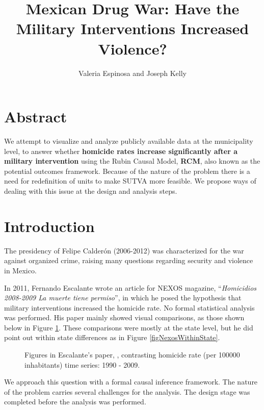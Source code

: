 \documentclass{article}[11 pt]
\begin{document}
	\title{Mexican Drug War: Have the Military Interventions Increased Violence?}
	\author{Valeria Espinosa and Joseph Kelly}
	
	\maketitle

\section{Abstract}
  We attempt to visualize and analyze publicly available data at the municipality level, to answer whether \textbf{homicide rates increase significantly after a military intervention} using the Rubin Causal Model, \textbf{RCM}, also known as the potential outcomes framework. Because of the nature of the problem there is a need for redefinition of units to make SUTVA more feasible. We propose ways of dealing with this issue at the design and analysis steps.
	
\section{Introduction}	
	The presidency of Felipe Calder\'{o}n (2006-2012) was characterized for the war against organized crime, raising many questions regarding security and violence in Mexico.
	
In 2011, Fernando Escalante wrote an article for NEXOS magazine, ``\emph{Homicidios 2008-2009 La muerte tiene permiso}'', in which he posed the hypothesis that military interventions increased the homicide rate. No formal statistical analysis was performed. His paper mainly showed visual comparisons, as those shown below in Figure \ref{figNexos}. These comparisons were mostly at the state level, but he did point out within state differences as in Figure \ref{figNexosWithinState}.
\begin{figure}[htdp]
    \centering
{}
\caption{Figures in Escalante's paper, \cite{Nexos}, contrasting homicide rate (per 100000 inhabitants) time series: 1990 - 2009.}	
			\label{figNexos}
\end{figure}
	We approach this question with a formal causal inference framework. The nature of the problem carries several challenges for the analysis. The design stage was completed before the analysis was performed.
	
\end{document}
